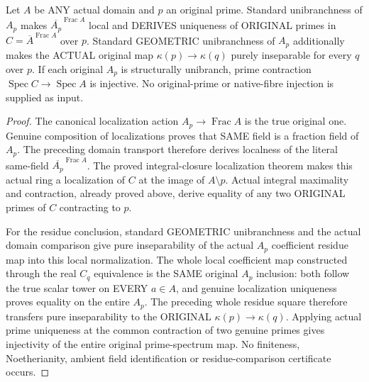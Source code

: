 \begin{theorem}
\label{algebra:structural-domain-normalization-primes}
Let $A$ be ANY actual domain and $p$ an original prime.
Standard unibranchness of $A_p$ makes
$\overline{A_p}^{\operatorname{Frac}A}$ local and DERIVES uniqueness of
ORIGINAL primes in $C=\overline A^{\operatorname{Frac}A}$ over $p$.
Standard GEOMETRIC unibranchness of $A_p$ additionally makes the ACTUAL
original map $\kappa(p)\to\kappa(q)$ purely inseparable for every $q$
over $p$. If each original $A_p$ is structurally unibranch, prime
contraction $\operatorname{Spec}C\to\operatorname{Spec}A$ is injective.
No original-prime or native-fibre injection is supplied as input.
\leanok
\end{theorem}
\begin{proof}
The canonical localization action $A_p\to\operatorname{Frac}A$
is the true original one. Genuine composition of localizations proves
that SAME field is a fraction field of $A_p$. The preceding domain
transport therefore derives localness of the literal same-field
$\overline{A_p}^{\operatorname{Frac}A}$. The proved integral-closure
localization theorem makes this actual ring a localization of $C$
at the image of $A\setminus p$. Actual integral maximality and
contraction, already proved above, derive equality of any two
ORIGINAL primes of $C$ contracting to $p$.

For the residue conclusion, standard GEOMETRIC unibranchness and the
actual domain comparison give pure inseparability of the actual
$A_p$ coefficient residue map into this local normalization. The
whole local coefficient map constructed through the real $C_q$
equivalence is the SAME original $A_p$ inclusion: both follow the
true scalar tower on EVERY $a\in A$, and genuine localization
uniqueness proves equality on the entire $A_p$. The preceding whole
residue square therefore transfers pure inseparability to the
ORIGINAL $\kappa(p)\to\kappa(q)$. Applying actual prime uniqueness
at the common contraction of two genuine primes gives injectivity
of the entire original prime-spectrum map. No finiteness, Noetherianity,
ambient field identification or residue-comparison certificate occurs.
\end{proof}

